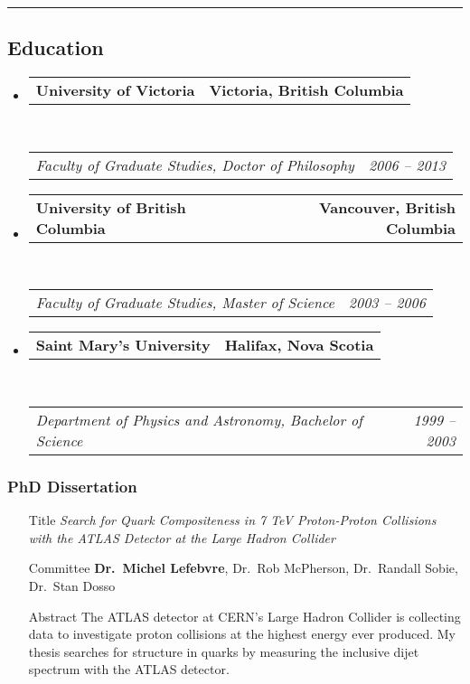 \documentclass[12pt,a4paper]{article}
\makeatletter
\newcommand{\headerrow}[2]
{\begin{tabular*}{\linewidth}{l@{\extracolsep{\fill}}r}
	#1 &
	#2 \\
\end{tabular*}}
\newcommand{\colorrule}[1]
{
  {\color{#1}\hrule height 2pt}
  \vspace{1.0em}
}
\makeatother
\begin{document}
\colorrule{NavyBlue}
\subsection*{Education}
\begin{itemize}
  \parskip=0.1em

	\item
	\headerrow
		{\textbf{University of Victoria}}
		{\textbf{Victoria, British Columbia}}
	\\
	\headerrow
		{\emph{Faculty of Graduate Studies, Doctor of Philosophy}}
		{\emph{2006 -- 2013}}

  \item
	\headerrow
		{\textbf{University of British Columbia}}
		{\textbf{Vancouver, British Columbia}}
	\\
	\headerrow
		{\emph{Faculty of Graduate Studies, Master of Science}}
		{\emph{2003 -- 2006}}

  \item
	\headerrow
		{\textbf{Saint Mary's University}}
		{\textbf{Halifax, Nova Scotia}}
	\\
	\headerrow
		{\emph{Department of Physics and Astronomy, Bachelor of Science}}
		{\emph{1999 -- 2003}}

\end{itemize}

\subsubsection*{PhD Dissertation}
\begin{itemize}
	\item[Title]
	{\it Search for Quark Compositeness in 7 TeV Proton-Proton Collisions with the
	 ATLAS Detector at the Large Hadron Collider}
	\item[Committee]
	{\bf Dr.\ Michel Lefebvre}, Dr.\ Rob McPherson, Dr.\ Randall Sobie,
	Dr.\ Stan Dosso
	\item[Abstract]
	{\small The ATLAS detector at CERN’s Large Hadron Collider is collecting
	 data to investigate proton collisions at the highest energy ever produced. My
	 thesis searches for structure in quarks by measuring the inclusive dijet
	 spectrum with the ATLAS detector.}
\end{itemize}
\end{document}
